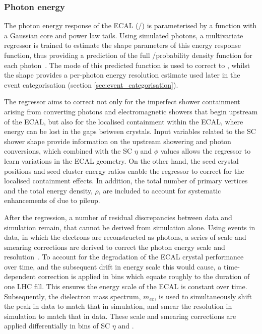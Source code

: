 \subsubsection{Photon energy}
The photon energy response of the ECAL (\Etrue/\Eraw) is parameterised by a function with a Gaussian core and power law tails. Using simulated photons, a multivariate regressor is trained to estimate the shape parameters of this energy response function, thus providing a prediction of the full \Etrue/\Eraw probability density function for each photon~\cite{Khachatryan:2015iwa}. The mode of this predicted function is used to correct \Eraw to \Etrue, whilst the shape provides a per-photon energy resolution estimate used later in the event categorisation (section \ref{sec:event_categorisation}).

The regressor aims to correct not only for the imperfect shower containment arising from converting photons and electromagnetic showers that begin upstream of the ECAL, but also for the localised containment within the ECAL, where energy can be lost in the gaps between crystals. Input variables related to the SC shower shape provide information on the upstream showering and photon conversions, which combined with the SC $\eta$ and $\phi$ values allows the regressor to learn variations in the ECAL geometry. On the other hand, the seed crystal positions and seed cluster energy ratios enable the regressor to correct for the localised containment effects. In addition, the total number of primary vertices and the total energy density, $\rho$, are included to account for systematic enhancements of \Eraw due to pileup.

After the regression, a number of residual discrepancies between data and simulation remain, that cannot be derived from simulation alone. Using \Zee events in data, in which the electrons are reconstructed as photons, a series of scale and smearing corrections are derived to correct the photon energy scale and resolution~\cite{Sirunyan:2020xwk}. To account for the degradation of the ECAL crystal performance over time, and the subsequent drift in energy scale this would cause, a time-dependent correction is applied in bins which equate roughly to the duration of one LHC fill. This ensures the energy scale of the ECAL is constant over time. Subsequently, the dielectron mass spectrum, $m_{ee}$, is used to simultaneously shift the peak in data to match that in simulation, and smear the resolution in simulation to match that in data. These scale and smearing corrections are applied differentially in bins of SC $\eta$ and \RNINE. 


